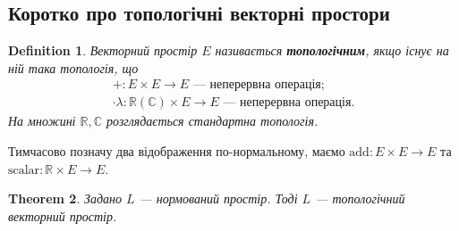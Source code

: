 \documentclass[a4paper, 10pt]{article}
\theoremstyle{theoremdd}
\newtheorem{theorem}{Theorem}[subsection]
\theoremstyle{theoremdd}
\newtheorem{definition}[theorem]{Definition}
\theoremstyle{theoremdd}
\theoremstyle{theoremdd}
\theoremstyle{theoremdd}
\theoremstyle{theoremdd}
\theoremstyle{theoremdd}
\theoremstyle{theoremdd}
\begin{document}
\subsection{Коротко про топологічні векторні простори}
\begin{definition}
Векторний простір $E$ називається \textbf{топологічним}, якщо існує на ній така топологія, що
\begin{align*}
+ \colon E \times E \to E \text{ --- неперервна операція}; \\
\cdot \lambda \colon \mathbb{R} (\mathbb{C}) \times E \to E \text{ --- неперервна операція.}
\end{align*}
\noindent
На множині $\mathbb{R}, \mathbb{C}$ розглядається стандартна топологія.
\end{definition}
\noindent
Тимчасово позначу два відображення по-нормальному, маємо $\text{add} \colon E \times E \to E$ та $\text{scalar} \colon \mathbb{R} \times E \to E$.

\begin{theorem}
Задано $L$ --- нормований простір. Тоді $L$ --- топологічний векторний простір.
\end{theorem}
\end{document}
